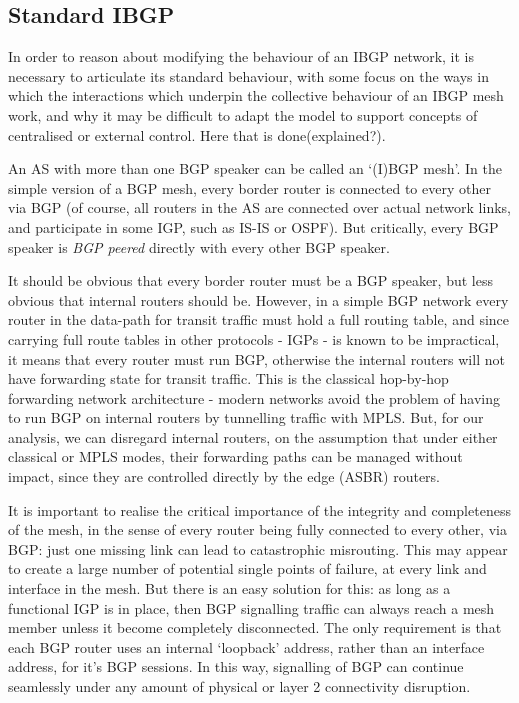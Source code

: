 \subsection{Standard IBGP}
In order to reason about modifying the behaviour of an IBGP network, it is
necessary to articulate its standard behaviour, with some focus on the ways in
which the interactions which underpin the collective behaviour of an IBGP mesh
work, and why it may be difficult to adapt the model to support concepts of
centralised or external control.  Here that is done(explained?).

An AS with more than one BGP speaker can be called an `(I)BGP mesh'.  In the
simple version of a BGP mesh, every border router is connected to every other
via BGP (of course, all routers in the AS are connected over actual network
links, and participate in some IGP, such as IS-IS or OSPF).  But critically,
every BGP speaker is \textit{BGP peered} directly with every other BGP speaker.

It should be obvious that every border router must be a BGP speaker, but less
obvious that internal routers should be.  However, in a simple BGP network
every router in the data-path for transit traffic must hold a full routing
table, and since carrying full route tables in other protocols - IGPs - is
known to be impractical, it means that every router must run BGP, otherwise the
internal routers will not have forwarding state for transit traffic.  This is
the classical hop-by-hop forwarding network architecture - modern networks
avoid the problem of having to run BGP on internal routers by tunnelling
traffic with MPLS.
But, for our analysis, we can disregard internal routers, on the assumption
that under either classical or MPLS modes, their forwarding paths can be managed
without impact, since they are controlled directly by the edge (ASBR) routers.

It is important to realise the critical importance of the integrity and completeness of the mesh, in the sense of every router being fully connected to every other, via BGP: just one missing link can lead to catastrophic misrouting.  This may appear to create a large number of potential single points of failure, at every link and interface in the mesh.  But there is an easy solution for this: as long as a functional IGP is in place, then BGP signalling traffic can always reach a mesh member unless it become completely disconnected.  The only requirement is that each BGP router uses an internal `loopback' address, rather than an interface address, for it's BGP sessions.  In this way, signalling of BGP can continue seamlessly under any amount of physical or layer 2 connectivity disruption.  

